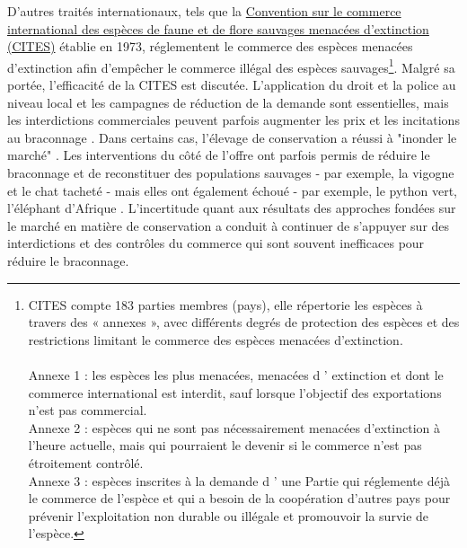  
 D'autres traités internationaux, tels que la \href{https://cites.org/fra}{Convention sur le commerce international des espèces de faune et de flore sauvages menacées d'extinction (CITES)} établie en 1973, réglementent le commerce des espèces menacées d'extinction afin d'empêcher le commerce illégal des espèces sauvages\footnote{CITES compte 183 parties membres (pays), elle répertorie les espèces à travers des « annexes », avec différents degrés de protection des espèces et des restrictions limitant le commerce des espèces menacées d'extinction. \\
\\
Annexe 1 : les espèces les plus menacées, menacées d ' extinction et dont le commerce international est interdit, sauf lorsque l'objectif des exportations n'est pas commercial.
\\
Annexe 2 : espèces qui ne sont pas nécessairement menacées d'extinction à l'heure actuelle, mais qui pourraient le devenir si le commerce n'est pas étroitement contrôlé.
\\
Annexe 3 : espèces inscrites à la demande d ' une Partie qui réglemente déjà le commerce de l'espèce et qui a besoin de la coopération d'autres pays pour prévenir l'exploitation non durable ou illégale et promouvoir la survie de l'espèce. }. Malgré sa portée, l'efficacité de la CITES est discutée. L'application du droit et la police au niveau local \citep{HEID2023102784} et les campagnes de réduction de la demande \citep{macfarlane_reducing_2022, moorhouse_demand_2024} sont essentielles, mais les interdictions commerciales peuvent parfois augmenter les prix et les incitations au braconnage \citep{hsiang_does_2016}. Dans certains cas, l'élevage de conservation a réussi à "inonder le marché" \citep{gentry_looking_2019, phelps_framework_2014, tensen_under_2016}. Les interventions du côté de l'offre ont parfois permis de réduire le braconnage et de reconstituer des populations sauvages - par exemple, la vigogne et le chat tacheté \citep{iucn_world_2000, sahley_biological_2007}- mais elles ont également échoué - par exemple, le python vert, l'éléphant d'Afrique \citep{lyons_wildlife_2011, hsiang_does_2016}.   L'incertitude quant aux résultats des approches fondées sur le marché en matière de conservation a conduit à continuer de s'appuyer sur des interdictions et des contrôles du commerce qui sont souvent inefficaces pour réduire le braconnage.

